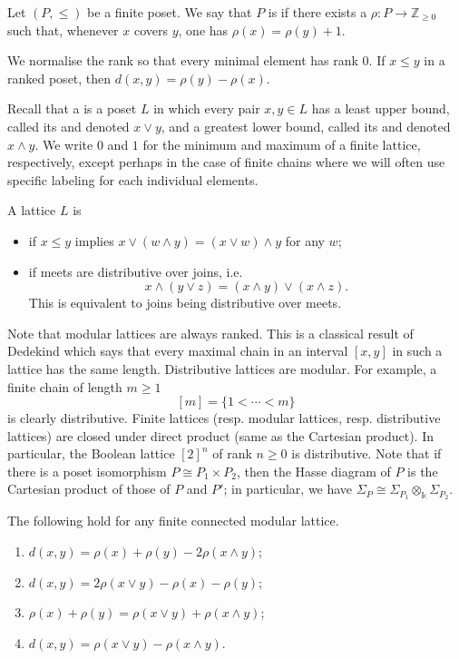 \documentclass[a4paper,leqno]{amsart}
\begin{document}
\begin{dfn}
Let $(P,\leq)$ be a finite poset. We say that $P$ is  if
there exists a 
$\rho:P\to\mathbb Z_{\geq0}$ such that, whenever $x$ covers $y$, one has
$\rho(x)=\rho(y)+1$.
\end{dfn}
We normalise the rank so that every minimal element has rank $0$. If
$x\leq y$ in a ranked poset, then $d(x,y)=\rho(y)-\rho(x)$.

Recall that a  is a poset $L$ in which every pair
$x,y\in L$ has a least upper bound, called its  and denoted
$x\vee y$, and a greatest lower bound, called its  and denoted
$x\wedge y$. We write $0$ and $1$ for the minimum and maximum of a finite lattice, respectively, except perhaps in the case of finite chains where we will often use specific labeling for each individual elements.

\begin{dfn}
A lattice $L$ is
\begin{itemize}
    \item {} if $x\leq y$ implies
    $x\vee(w\wedge y)=(x\vee w)\wedge y$ for any $w$;

    \item {} if meets are distributive over joins, i.e.
    \[
    x\wedge(y\vee z)=(x\wedge y)\vee(x\wedge z).
    \]
    This is equivalent to joins being distributive over meets.
\end{itemize}
\end{dfn}
Note that modular lattices are always ranked. This is a classical result of Dedekind which says that every maximal chain in an interval $[x,y]$ in such a lattice has the same length. Distributive lattices are modular. For example, a finite chain of length $m\ge 1$
\[
[m]=\{1<\cdots<m\}
\]
is clearly distributive.
Finite lattices (resp. modular lattices, resp. distributive lattices) are closed under direct product (same as the Cartesian product).  In particular, the Boolean lattice $[2]^n$ of rank $n\ge 0$ is distributive.
Note that if there is a poset isomorphism $P\cong P_1\times P_2$, then the Hasse diagram of $P$ is the Cartesian product of those of $P$ and $P'$; in particular, we have $\Sigma_P \cong \Sigma_{P_1}\otimes_{\Bbbk} \Sigma_{P_2}$.

\begin{lem}\label{lem:modular-lattice-distance}
The following hold for any finite connected modular lattice.
\begin{enumerate}
    \item $d(x,y)=\rho(x)+\rho(y)-2\rho(x\wedge y)$;
    \item $d(x,y)=2\rho(x\vee y)-\rho(x)-\rho(y)$;
    \item $\rho(x)+\rho(y)=\rho(x\vee y)+\rho(x\wedge y)$;
    \item $d(x,y)=\rho(x\vee y)-\rho(x\wedge y)$.
\end{enumerate}
\end{lem}
\end{document}

